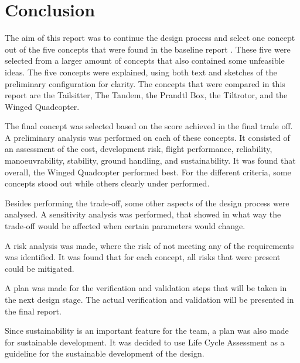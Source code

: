 \chapter{Conclusion}



The aim of this report was to continue the design process and select one concept out of the five concepts that were found in the baseline report \cite{baseline}. These five were selected from a larger amount of concepts that also contained some unfeasible ideas. The five concepts were explained, using both text and sketches of the preliminary configuration for clarity. The concepts that were compared in this report are the Tailsitter, The Tandem, the Prandtl Box, the Tiltrotor, and the Winged Quadcopter.

The final concept was selected based on the score achieved in the final trade off. A preliminary analysis was performed on each of these concepts. It consisted of an assessment of the cost, development risk, flight performance, reliability, manoeuvrability, stability, ground handling, and sustainability. %
It was found that overall, the Winged Quadcopter performed best. 
For the different criteria, some concepts stood out while others clearly under performed. 


Besides performing the trade-off, some other aspects of the design process were analysed. A sensitivity analysis was performed, that showed in what way the trade-off would be affected when certain parameters would change.


A risk analysis was made, where the risk of not meeting any of the requirements was identified. It was found that for each concept, all risks that were present could be mitigated. 


A plan was made for the verification and validation steps that will be taken in the next design stage. The actual verification and validation will be presented in the final report.


Since sustainability is an important feature for the team, a plan was also made for sustainable development. It was decided to use Life Cycle Assessment as a guideline for the sustainable development of the design.

